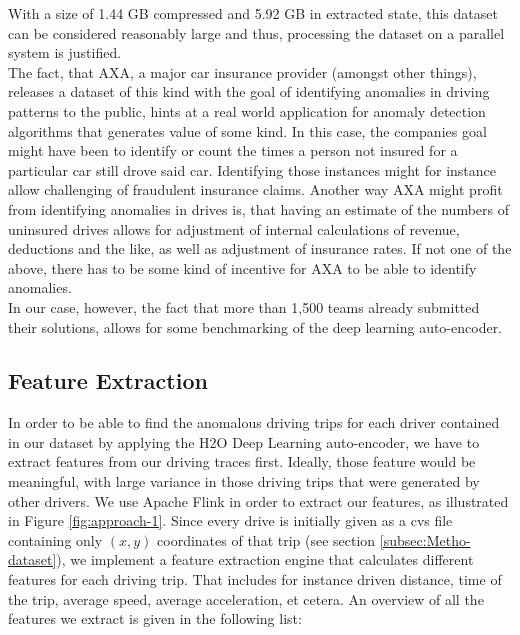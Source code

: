 \documentclass{vldb}
\begin{document}
With a size of 1.44 GB compressed and 5.92 GB in extracted state, this dataset can be considered reasonably large and thus, processing the dataset on a parallel system is justified. \\
The fact, that AXA, a major car insurance provider (amongst other things), releases a dataset of this kind with the goal of identifying anomalies in driving patterns to the public, hints at a real world application for anomaly detection algorithms that generates value of some kind. In this case, the companies goal might have been to identify or count the times a person not insured for a particular car still drove said car. Identifying those instances might for instance allow challenging of fraudulent insurance claims. Another way AXA might profit from identifying anomalies in drives is, that having an estimate of the numbers of uninsured drives allows for adjustment of internal calculations of revenue, deductions and the like, as well as adjustment of insurance rates. If not one of the above, there has to be some kind of incentive for AXA to be able to identify anomalies. \\
In our case, however, the fact that more than 1,500 teams already submitted their solutions, allows for some benchmarking of the deep learning auto-encoder.

\subsection{Feature Extraction}
\label{subsec:Metho-feature}
In order to be able to find the anomalous driving trips for each driver contained in our dataset by applying the H2O Deep Learning auto-encoder, we have to extract features from our driving traces first. Ideally, those feature would be meaningful, with large variance in those driving trips that were generated by other drivers. We use Apache Flink in order to extract our features, as illustrated in Figure \ref{fig:approach-1}. Since every drive is initially given as a cvs file containing only $(x, y)$ coordinates of that trip (see section \ref{subsec:Metho-dataset}), we implement a feature extraction engine that calculates different features for each driving trip. That includes for instance driven distance, time of the trip, average speed, average acceleration, et cetera. An overview of all the features we extract is given in the following list:
\end{document}
